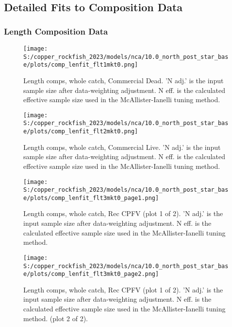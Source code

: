\documentclass[11pt,
  letterpaper,
]{article}
\begin{document}
\subsection{Detailed Fits to Composition Data}\label{detailed-fit-comps}

\subsubsection{Length Composition Data}\label{length-data}

\begin{figure}
{\centering
\texttt{[image: S:/copper\_rockfish\_2023/models/nca/10.0\_north\_post\_star\_base/plots/comp\_lenfit\_flt1mkt0.png]}
}
\caption{Length comps, whole catch, Commercial Dead.  'N adj.' is the input sample size after data-weighting adjustment. N eff. is the calculated effective sample size used in the McAllister-Ianelli tuning method.\label{fig:comp-lenfit-flt1mkt0}}
\end{figure}

\begin{figure}
{\centering
\texttt{[image: S:/copper\_rockfish\_2023/models/nca/10.0\_north\_post\_star\_base/plots/comp\_lenfit\_flt2mkt0.png]}
}
\caption{Length comps, whole catch, Commercial Live.  'N adj.' is the input sample size after data-weighting adjustment. N eff. is the calculated effective sample size used in the McAllister-Ianelli tuning method.\label{fig:comp-lenfit-flt2mkt0}}
\end{figure}

\begin{figure}
{\centering
\texttt{[image: S:/copper\_rockfish\_2023/models/nca/10.0\_north\_post\_star\_base/plots/comp\_lenfit\_flt3mkt0\_page1.png]}
}
\caption{Length comps, whole catch, Rec CPFV (plot 1 of 2).  'N adj.' is the input sample size after data-weighting adjustment. N eff. is the calculated effective sample size used in the McAllister-Ianelli tuning method.\label{fig:comp-lenfit-flt3mkt0-page1}}
\end{figure}

\begin{figure}
{\centering
\texttt{[image: S:/copper\_rockfish\_2023/models/nca/10.0\_north\_post\_star\_base/plots/comp\_lenfit\_flt3mkt0\_page2.png]}
}
\caption{Length comps, whole catch, Rec CPFV (plot 1 of 2).  'N adj.' is the input sample size after data-weighting adjustment. N eff. is the calculated effective sample size used in the McAllister-Ianelli tuning method. (plot 2 of 2).\label{fig:comp-lenfit-flt3mkt0-page2}}
\end{figure}
\end{document}
